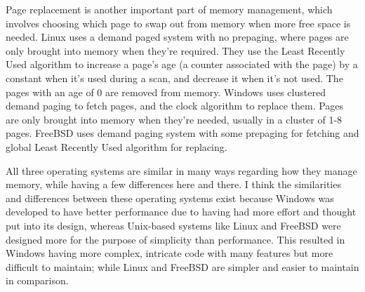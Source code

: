 \documentclass[10pt,draftclsnofoot,onecolumn,letterpaper]{IEEEtran}
\begin{document}
Page replacement is another important part of memory management, which involves choosing which page to swap out from memory when more free space is needed. Linux uses a demand paged system with no prepaging, where pages are only brought into memory when they're required\cite{3}. They use the Least Recently Used algorithm to increase a page's age (a counter associated with the page) by a constant when it's used during a scan, and decrease it when it's not used. The pages with an age of 0 are removed from memory\cite{2}. Windows uses clustered demand paging to fetch pages, and the clock algorithm to replace them. Pages are only brought into memory when they're needed, usually in a cluster of 1-8 pages. FreeBSD uses demand paging system with some prepaging for fetching and global Least Recently Used algorithm for replacing\cite{2}.

All three operating systems are similar in many ways regarding how they manage memory, while having a few differences here and there. I think the similarities and differences between these operating systems exist because Windows was developed to have better performance due to having had more effort and thought put into its design, whereas Unix-based systems like Linux and FreeBSD were designed more for the purpose of simplicity than performance. This resulted in Windows having more complex, intricate code with many features but more difficult to maintain; while Linux and FreeBSD are simpler and easier to maintain in comparison.



{}
\end{document}
